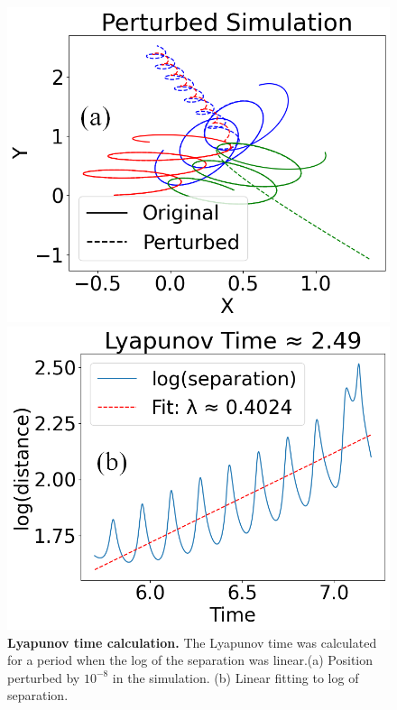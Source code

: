\documentclass[%
 reprint,
 amsmath,amssymb,
 aps,
]{revtex4-2}
\begin{document}
\begin{figure}
    \centering
            \begin{minipage}{0.2333\textwidth}
                \centering
                \includegraphics[width=\columnwidth]{Lyapunov_x_y_simulation_marked.png}
            \end{minipage}
            \hfill
            \begin{minipage}{0.2427\textwidth}
                \centering
                \includegraphics[width=\columnwidth]{Lyapunov_time_marked.png}
            \end{minipage}
    
    \caption{\textbf{Lyapunov time calculation.} The Lyapunov time was calculated for a period when the log of the separation was linear.(a) Position perturbed by $10^{-8}$ in the simulation. (b) Linear fitting to log of separation.}
    \label{fig:lyapunov}
\end{figure}
\end{document}
